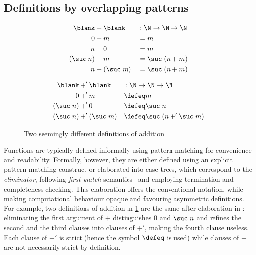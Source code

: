 \documentclass[a4paper,UKenglish,numberwithinsect,cleveref,thm-restate]{lipics-v2021}
\begin{document}


\subsection{Definitions by overlapping patterns} \label{sec:meta:overlapping}
\begin{figure}[b]
\begin{minipage}[t]{.48\textwidth}
  \begin{alignat*}{5}
    \blank  & + \blank     && : \N \to \N \to \N \\
    0       &  + m         && = m  \\
  n         &  + 0         && = m  \\
  (\suc\;n) &  + m         && = \suc\;(n + m) \\
  n         &  + (\suc\;m) && = \suc\;(n + m)
\end{alignat*}
\end{minipage}
\begin{minipage}[t]{.5\textwidth}
\begin{alignat*}{5}
  \blank         & +'\blank     && : \N \to \N \to \N \\
  0              & +' m         && \defeq m  \\
  (\suc\;n)      & +' 0         && \defeq \suc\;n \\
  (\suc\;n)      & +' (\suc\;m) && \defeq \suc\;(n +' \suc\;m)
\end{alignat*}
\end{minipage}
\caption{Two seemingly different definitions of addition}
\label{fig:additions}
\end{figure}
Functions are typically defined informally using pattern matching for convenience and readability. Formally, however, they are either defined using an explicit pattern-matching construct or elaborated into case trees, which correspond to the \emph{eliminator}, following \emph{first-match} semantics~\cite{Cockx2020a} and employing termination and completeness checking.
This elaboration offers the conventional notation, while making computational behaviour opaque and favouring asymmetric definitions.
For example, two definitions of addition in \cref{fig:additions} are the same
after elaboration in \Agda: eliminating the first argument of $+$ distinguishes $0$ and $\suc\;n$ and refines the second and the third clauses into clauses of $+'$, making the fourth clause useless.
Each clause of $+'$ is strict (hence the symbol $\defeq$ is used) while clauses of $+$ are not necessarily strict by definition.
\end{document}
